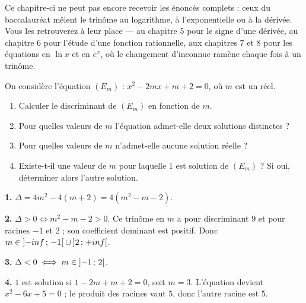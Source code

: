 \begin{remarque}
Ce chapitre-ci ne peut pas encore recevoir les énoncés complets : ceux du
baccalauréat mêlent le trinôme au logarithme, à l'exponentielle ou à la
dérivée. Vous les retrouverez à leur place — au chapitre 5 pour le signe
d'une dérivée, au chapitre 6 pour l'étude d'une fonction rationnelle, aux
chapitres 7 et 8 pour les équations en $\ln x$ et en $e^{x}$, où le
changement d'inconnue ramène chaque fois à un trinôme.
\end{remarque}

\begin{jecherche}
On considère l'équation $(E_{m})$ : $x^{2}-2mx+m+2 = 0$, où $m$ est un réel.

\begin{enumerate}[label=\textbf{\arabic*.}, leftmargin=*, itemsep=0.3em]
  \item Calculer le discriminant de $(E_{m})$ en fonction de $m$.
  \item Pour quelles valeurs de $m$ l'équation admet-elle deux solutions
        distinctes ?
  \item Pour quelles valeurs de $m$ n'admet-elle aucune solution réelle ?
  \item Existe-t-il une valeur de $m$ pour laquelle $1$ est solution de
        $(E_{m})$ ? Si oui, déterminer alors l'autre solution.
\end{enumerate}
\end{jecherche}

\begin{corrige}
\textbf{1.} $\Delta = 4m^{2}-4(m+2) = 4\left(m^{2}-m-2\right)$.

\textbf{2.} $\Delta > 0 \iff m^{2}-m-2 > 0$. Ce trinôme en $m$ a pour
discriminant $9$ et pour racines $-1$ et $2$ ; son coefficient dominant est
positif. Donc
$m \in \left]-inf\,;\,-1\right[\cup\left]2\,;\,+inf\right[$.

\textbf{3.} $\Delta < 0 \iff m \in \left]-1\,;\,2\right[$.

\textbf{4.} $1$ est solution si $1-2m+m+2 = 0$, soit $m = 3$. L'équation
devient $x^{2}-6x+5 = 0$ ; le produit des racines vaut $5$, donc l'autre
racine est $5$.
\end{corrige}


